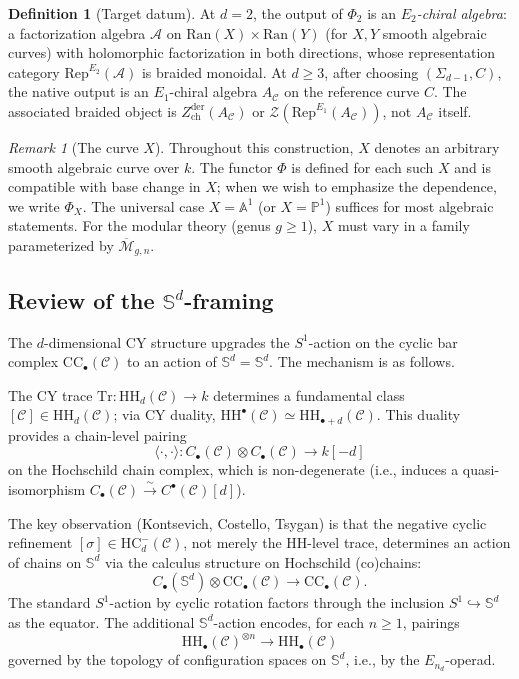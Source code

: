 \documentclass[11pt]{article}
\theoremstyle{plain}
\theoremstyle{definition}
\newtheorem{definition}[theorem]{Definition}
\theoremstyle{remark}
\newtheorem{remark}[theorem]{Remark}
\newcommand{\Eone}{E_1}
\newcommand{\Etwo}{E_2}
\newcommand{\En}{E_n}
\newcommand{\Rep}{\mathrm{Rep}}
\newcommand{\HH}{\mathrm{HH}}
\newcommand{\HC}{\mathrm{HC}}
\newcommand{\Tr}{\mathrm{Tr}}
\newcommand{\Sd}{\mathbb{S}^d}
\newcommand{\Ran}{\mathrm{Ran}}
\newcommand{\cA}{\mathcal{A}}
\newcommand{\cC}{\mathcal{C}}
\newcommand{\cZ}{\mathcal{Z}}
\begin{document}
\begin{definition}[Target datum]
\label{def:target}
At $d = 2$, the output of $\Phi_2$ is an \emph{$\Etwo$-chiral algebra}:
a factorization algebra $\cA$ on $\Ran(X) \times \Ran(Y)$ (for $X, Y$
smooth algebraic curves) with holomorphic factorization in both
directions, whose representation category $\Rep^{\Etwo}(\cA)$ is
braided monoidal. At $d \geq 3$, after choosing
$(\Sigma_{d-1}, C)$, the native output is an $\Eone$-chiral algebra
$A_\cC$ on the reference curve $C$. The associated braided object is
$Z^{\mathrm{der}}_{\mathrm{ch}}(A_\cC)$ or
$\cZ(\Rep^{\Eone}(A_\cC))$, not $A_\cC$ itself.
\end{definition}

\begin{remark}[The curve $X$]
\label{rem:choice-of-curve}
Throughout this construction, $X$ denotes an arbitrary smooth algebraic curve over $k$. The functor $\Phi$ is defined for each such $X$ and is compatible with base change in $X$; when we wish to emphasize the dependence, we write $\Phi_X$. The universal case $X = \mathbb{A}^1$ (or $X = \mathbb{P}^1$) suffices for most algebraic statements. For the modular theory (genus $g \geq 1$), $X$ must vary in a family parameterized by $\overline{\mathcal{M}}_{g,n}$.
\end{remark}

\subsection{Review of the $\Sd$-framing}
\label{sec:sd-framing-review}

The $d$-dimensional CY structure upgrades the $S^1$-action on the cyclic bar complex $\mathrm{CC}_\bullet(\cC)$ to an action of $\Sd = \mathbb{S}^d$. The mechanism is as follows.

The CY trace $\Tr \colon \HH_d(\cC) \to k$ determines a fundamental class $[\cC] \in \HH_d(\cC)$; via CY duality, $\HH^\bullet(\cC) \simeq \HH_{\bullet+d}(\cC)$. This duality provides a chain-level pairing
\[
\langle \cdot, \cdot \rangle \colon C_\bullet(\cC) \otimes C_\bullet(\cC) \longrightarrow k[-d]
\]
on the Hochschild chain complex, which is non-degenerate (i.e., induces a quasi-isomorphism $C_\bullet(\cC) \xrightarrow{\sim} C^\bullet(\cC)[d]$).

The key observation (Kontsevich, Costello, Tsygan) is that the negative cyclic refinement $[\sigma] \in \HC^-_d(\cC)$, not merely the HH-level trace, determines an action of chains on $\Sd$ via the calculus structure on Hochschild (co)chains:
\[
C_\bullet(\Sd) \otimes \mathrm{CC}_\bullet(\cC) \longrightarrow \mathrm{CC}_\bullet(\cC).
\]
The standard $S^1$-action by cyclic rotation factors through the inclusion $S^1 \hookrightarrow \Sd$ as the equator. The additional $\Sd$-action encodes, for each $n \geq 1$, pairings
\[
\HH_\bullet(\cC)^{\otimes n} \longrightarrow \HH_\bullet(\cC)
\]
governed by the topology of configuration spaces on $\Sd$, i.e., by the $\En_d$-operad.
\end{document}
